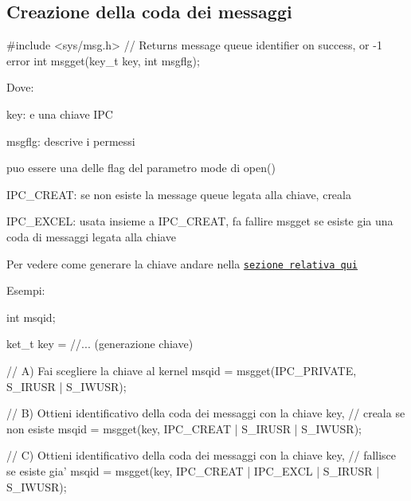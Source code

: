 \subsection*{Creazione della coda dei messaggi}


\begin{DoxyCode}
\textcolor{preprocessor}{#include <sys/msg.h>}
\textcolor{comment}{// Returns message queue identifier on success, or -1 error}
\textcolor{keywordtype}{int} msgget(key\_t key, \textcolor{keywordtype}{int} msgflg);
\end{DoxyCode}


Dove\+:
\begin{DoxyItemize}
\item {\ttfamily key}\+: e\textquotesingle{} una chiave I\+PC
\item {\ttfamily msgflg}\+: descrive i permessi
\begin{DoxyItemize}
\item puo\textquotesingle{} essere una delle flag del parametro {\ttfamily mode} di {\ttfamily open()}
\item {\ttfamily I\+P\+C\+\_\+\+C\+R\+E\+AT}\+: se non esiste la message queue legata alla chiave, creala
\item {\ttfamily I\+P\+C\+\_\+\+E\+X\+C\+EL}\+: usata insieme a {\ttfamily I\+P\+C\+\_\+\+C\+R\+E\+AT}, fa fallire msgget se esiste gia\textquotesingle{} una coda di messaggi legata alla chiave
\end{DoxyItemize}
\end{DoxyItemize}

Per vedere come generare la chiave andare nella \href{md_theory_generate_keys_generate_keys.html}{\tt sezione relativa qui}

Esempi\+: 
\begin{DoxyCode}
\textcolor{keywordtype}{int} msqid;

ket\_t key = \textcolor{comment}{//... (generazione chiave)}

\textcolor{comment}{// A) Fai scegliere la chiave al kernel}
msqid = msgget(IPC\_PRIVATE, S\_IRUSR | S\_IWUSR);

\textcolor{comment}{// B) Ottieni identificativo della coda dei messaggi con la chiave key,}
\textcolor{comment}{//    creala se non esiste}
msqid = msgget(key, IPC\_CREAT | S\_IRUSR | S\_IWUSR);

\textcolor{comment}{// C) Ottieni identificativo della coda dei messaggi con la chiave key,}
\textcolor{comment}{//    fallisce se esiste gia'}
msqid = msgget(key, IPC\_CREAT | IPC\_EXCL | S\_IRUSR | S\_IWUSR);
\end{DoxyCode}


